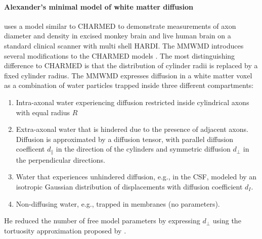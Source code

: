\paragraph*{Alexander's minimal model of white matter diffusion} 
\label{par:alexanders_model}
\citet{Alexander:2010} uses a model similar to CHARMED to demonstrate measurements of axon diameter and density in excised monkey brain and live human brain on a standard clinical scanner with multi shell \gls{HARDI}. The \gls{MMWMD} introduces several modifications to the CHARMED models \citep{Dyrby:2010}. The most distinguishing  difference to CHARMED is that the distribution of cylinder radii is replaced by a fixed cylinder radius. The \gls{MMWMD} expresses diffusion in a white matter voxel as a combination of water particles trapped inside three different compartments: 
\begin{enumerate}
  \item Intra-axonal water experiencing diffusion restricted inside cylindrical axons with equal radius $R$ \citep{Stepisnik:1993,Vangelderen:1994}
  \item Extra-axonal water that is hindered due to the presence of adjacent axons. Diffusion is approximated by a diffusion tensor, with parallel diffusion coefficent $d_\parallel$ in the direction of the cylinders and symmetric diffusion $d_\perp$ in the perpendicular directions.
  \item Water that experiences unhindered diffusion, e.g., in the {\gls{CSF}}, modeled by an isotropic Gaussian distribution of displacements with diffusion coefficient $d_{I}$.
  \item Non-diffusing water, e.g., trapped in membranes (no parameters).
\end{enumerate}
He reduced the number of free model parameters by expressing $d_\perp$ using the tortuosity approximation proposed by \citet{Szafer:1995}.

